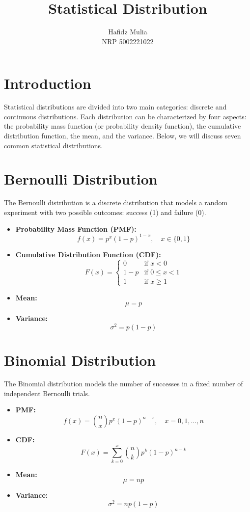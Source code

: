 \documentclass{article}
\title{Statistical Distribution}
\author{Hafidz Mulia \\ NRP 5002221022}
\date{}
\begin{document}
\maketitle

\section*{Introduction}
Statistical distributions are divided into two main categories: discrete and continuous distributions. Each distribution can be characterized by four aspects: the probability mass function (or probability density function), the cumulative distribution function, the mean, and the variance. Below, we will discuss seven common statistical distributions.

\section{Bernoulli Distribution}
The Bernoulli distribution is a discrete distribution that models a random experiment with two possible outcomes: success (1) and failure (0).

\begin{itemize}
    \item \textbf{Probability Mass Function (PMF):} 
    \[
    f(x) = p^x (1-p)^{1-x}, \quad x \in \{0, 1\}
    \]
    \item \textbf{Cumulative Distribution Function (CDF):}
    \[
    F(x) = \begin{cases}
    0 & \text{if } x < 0 \\
    1-p & \text{if } 0 \leq x < 1 \\
    1 & \text{if } x \geq 1
    \end{cases}
    \]
    \item \textbf{Mean:} 
    \[
    \mu = p
    \]
    \item \textbf{Variance:} 
    \[
    \sigma^2 = p(1-p)
    \]
\end{itemize}

\section{Binomial Distribution}
The Binomial distribution models the number of successes in a fixed number of independent Bernoulli trials.

\begin{itemize}
    \item \textbf{PMF:} 
    \[
    f(x) = \binom{n}{x} p^x (1-p)^{n-x}, \quad x = 0, 1, \ldots, n
    \]
    \item \textbf{CDF:} 
    \[
    F(x) = \sum_{k=0}^{x} \binom{n}{k} p^k (1-p)^{n-k}
    \]
    \item \textbf{Mean:} 
    \[
    \mu = np
    \]
    \item \textbf{Variance:} 
    \[
    \sigma^2 = np(1-p)
    \]
\end{itemize}
\end{document}
